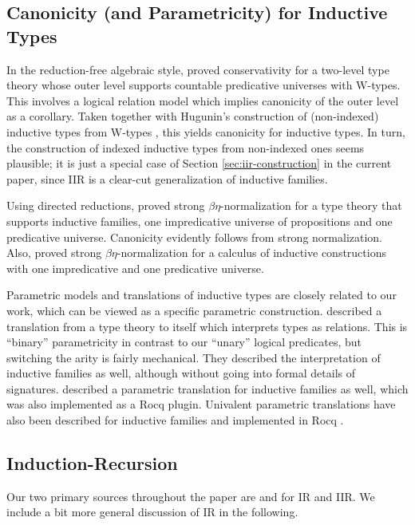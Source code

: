 \documentclass[acmsmall,screen,review]{acmart}
\begin{document}
\subsection{Canonicity (and Parametricity) for Inductive Types}

In the reduction-free algebraic style, \citet{DBLP:journals/pacmpl/Kovacs24} proved conservativity
for a two-level type theory whose outer level supports countable predicative universes with
W-types. This involves a logical relation model which implies canonicity of the outer level as a
corollary. Taken together with Hugunin's construction of (non-indexed) inductive types from W-types
\cite{whynotw}, this yields canonicity for inductive types. In turn, the construction of
indexed inductive types from non-indexed ones seems plausible; it is just a special case of
Section \ref{sec:iir-construction} in the current paper, since IIR is a clear-cut generalization
of inductive families.

Using directed reductions, \citet{DBLP:phd/ethos/Goguen94} proved strong $\beta\eta$-normalization
for a type theory that supports inductive families, one impredicative universe of propositions and one
predicative universe. Canonicity evidently follows from strong normalization. Also,
\citet{DBLP:phd/hal/Werner94} proved strong $\beta\eta$-normalization for a calculus of inductive
constructions with one impredicative and one predicative universe.

Parametric models and translations of inductive types are closely related to our work, which can be
viewed as a specific parametric construction. \citet{bernardy12parametricity} described a
translation from a type theory to itself which interprets types as relations. This is ``binary''
parametricity in contrast to our ``unary'' logical predicates, but switching the arity is fairly
mechanical. They described the interpretation of inductive families as well, although without going
into formal details of signatures. \citet{pedrot2018failure} described a parametric translation for
inductive families as well, which was also implemented as a Rocq plugin. Univalent parametric
translations have also been described for inductive families and implemented in Rocq
\cite{tabareau2018equivalences,tabareau2021marriage,cohen2024trocq}.

\subsection{Induction-Recursion} Our two primary sources throughout the paper are
\cite{DBLP:journals/apal/DybjerS03} and \cite{DBLP:journals/jlp/DybjerS06} for IR and IIR. We include
a bit more general discussion of IR in the following.
\end{document}
